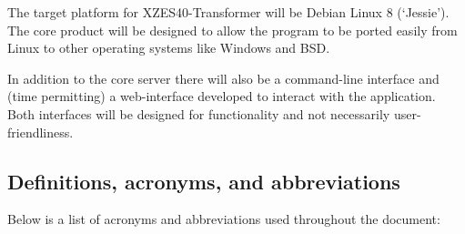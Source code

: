The target platform for XZES40-Transformer will be Debian Linux 8 (`Jessie').
The core product will be designed to allow the program to be ported easily from Linux to other operating systems like Windows and BSD.

In addition to the core server there will also be a command-line interface and (time permitting) a web-interface developed to interact with the application.
Both interfaces will be designed for functionality and not necessarily user-friendliness.


\subsection{Definitions, acronyms, and abbreviations}

Below is a list of acronyms and abbreviations used throughout the document:

